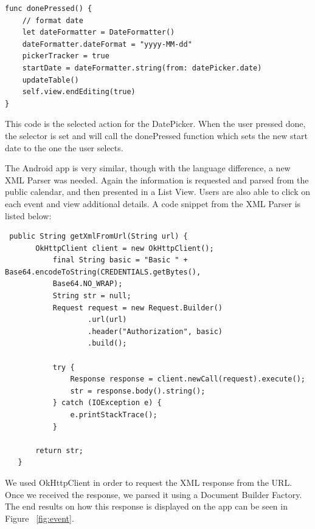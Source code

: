 \documentclass[letterpaper,10pt,draftclsnofoot,onecolumn,titlepage]{IEEEtran}
\begin{document}
		\begin{lstlisting}
func donePressed() {
    // format date
    let dateFormatter = DateFormatter()
    dateFormatter.dateFormat = "yyyy-MM-dd"
    pickerTracker = true
    startDate = dateFormatter.string(from: datePicker.date)
    updateTable()
    self.view.endEditing(true)
}
		\end{lstlisting}

		This code is the selected action for the DatePicker.
		When the user pressed done, the selector is set and will call the donePressed function which sets the new start date to the one the user selects.
		\par
		The Android app is very similar, though with the language difference, a new XML Parser was needed.
		Again the information is requested and parsed from the public calendar, and then presented in a List View.
		Users are also able to click on each event and view additional details.
		A code snippet from the XML Parser is listed below:

		\begin{lstlisting}
 public String getXmlFromUrl(String url) {
       OkHttpClient client = new OkHttpClient();
           final String basic = "Basic " + Base64.encodeToString(CREDENTIALS.getBytes(),
           Base64.NO_WRAP);
           String str = null;
           Request request = new Request.Builder()
                   .url(url)
                   .header("Authorization", basic)
                   .build();

           try {
               Response response = client.newCall(request).execute();
               str = response.body().string();
           } catch (IOException e) {
               e.printStackTrace();
           }

       return str;
   }
   		\end{lstlisting}

		We used OkHttpClient in order to request the XML response from the URL.
		Once we received the response, we parsed it using a Document Builder Factory.
		The end results on how this response is displayed on the app can be seen in Figure ~\ref{fig:event}.
\end{document}
